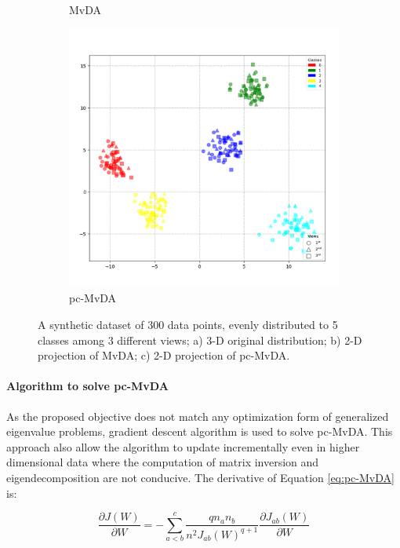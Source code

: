 \begin{figure}[htbp]
\begin{subfigure}{0.33\textwidth}
                \caption{MvDA}
            \end{subfigure}%
            \begin{subfigure}{0.33\textwidth}
                \centering
                \includegraphics[width=0.95\linewidth]{figs/Synthetic2_pc-MvDA.png}
                \caption{pc-MvDA}
            \end{subfigure}

            \caption{A synthetic dataset of 300 data points, evenly distributed to 5 classes among 3 different views; a) 3-D original distribution; b) 2-D projection of MvDA; c) 2-D projection of pc-MvDA.}
            \label{fig:synthetic2}
        \end{figure}


    \paragraph{Algorithm to solve pc-MvDA}
        As the proposed objective does not match any optimization form of generalized eigenvalue problems, gradient descent algorithm is used to solve pc-MvDA. This approach also allow the algorithm to update incrementally even in higher dimensional data where the computation of matrix inversion and eigendecomposition are not conducive. The derivative of Equation \eqref{eq:pc-MvDA} is:

        \begin{equation}
            \frac{\partial J\left(W\right)}{\partial W}=-\sum_{a<b}^{c}{\frac{q n_a n_b}{n^2{J_{ab}\left(W\right)}^{q+1}}\frac{\partial J_{ab}\left(W\right)}{\partial W}}
        \end{equation}

